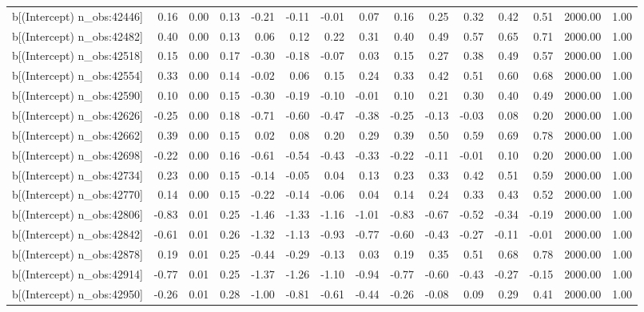 \begin{table}[ht]
\begin{tabular}{rrrrrrrrrrrrrrr}
  b[(Intercept) n\_obs:42446] & 0.16 & 0.00 & 0.13 & -0.21 & -0.11 & -0.01 & 0.07 & 0.16 & 0.25 & 0.32 & 0.42 & 0.51 & 2000.00 & 1.00 \\ 
  b[(Intercept) n\_obs:42482] & 0.40 & 0.00 & 0.13 & 0.06 & 0.12 & 0.22 & 0.31 & 0.40 & 0.49 & 0.57 & 0.65 & 0.71 & 2000.00 & 1.00 \\ 
  b[(Intercept) n\_obs:42518] & 0.15 & 0.00 & 0.17 & -0.30 & -0.18 & -0.07 & 0.03 & 0.15 & 0.27 & 0.38 & 0.49 & 0.57 & 2000.00 & 1.00 \\ 
  b[(Intercept) n\_obs:42554] & 0.33 & 0.00 & 0.14 & -0.02 & 0.06 & 0.15 & 0.24 & 0.33 & 0.42 & 0.51 & 0.60 & 0.68 & 2000.00 & 1.00 \\ 
  b[(Intercept) n\_obs:42590] & 0.10 & 0.00 & 0.15 & -0.30 & -0.19 & -0.10 & -0.01 & 0.10 & 0.21 & 0.30 & 0.40 & 0.49 & 2000.00 & 1.00 \\ 
  b[(Intercept) n\_obs:42626] & -0.25 & 0.00 & 0.18 & -0.71 & -0.60 & -0.47 & -0.38 & -0.25 & -0.13 & -0.03 & 0.08 & 0.20 & 2000.00 & 1.00 \\ 
  b[(Intercept) n\_obs:42662] & 0.39 & 0.00 & 0.15 & 0.02 & 0.08 & 0.20 & 0.29 & 0.39 & 0.50 & 0.59 & 0.69 & 0.78 & 2000.00 & 1.00 \\ 
  b[(Intercept) n\_obs:42698] & -0.22 & 0.00 & 0.16 & -0.61 & -0.54 & -0.43 & -0.33 & -0.22 & -0.11 & -0.01 & 0.10 & 0.20 & 2000.00 & 1.00 \\ 
  b[(Intercept) n\_obs:42734] & 0.23 & 0.00 & 0.15 & -0.14 & -0.05 & 0.04 & 0.13 & 0.23 & 0.33 & 0.42 & 0.51 & 0.59 & 2000.00 & 1.00 \\ 
  b[(Intercept) n\_obs:42770] & 0.14 & 0.00 & 0.15 & -0.22 & -0.14 & -0.06 & 0.04 & 0.14 & 0.24 & 0.33 & 0.43 & 0.52 & 2000.00 & 1.00 \\ 
  b[(Intercept) n\_obs:42806] & -0.83 & 0.01 & 0.25 & -1.46 & -1.33 & -1.16 & -1.01 & -0.83 & -0.67 & -0.52 & -0.34 & -0.19 & 2000.00 & 1.00 \\ 
  b[(Intercept) n\_obs:42842] & -0.61 & 0.01 & 0.26 & -1.32 & -1.13 & -0.93 & -0.77 & -0.60 & -0.43 & -0.27 & -0.11 & -0.01 & 2000.00 & 1.00 \\ 
  b[(Intercept) n\_obs:42878] & 0.19 & 0.01 & 0.25 & -0.44 & -0.29 & -0.13 & 0.03 & 0.19 & 0.35 & 0.51 & 0.68 & 0.78 & 2000.00 & 1.00 \\ 
  b[(Intercept) n\_obs:42914] & -0.77 & 0.01 & 0.25 & -1.37 & -1.26 & -1.10 & -0.94 & -0.77 & -0.60 & -0.43 & -0.27 & -0.15 & 2000.00 & 1.00 \\ 
  b[(Intercept) n\_obs:42950] & -0.26 & 0.01 & 0.28 & -1.00 & -0.81 & -0.61 & -0.44 & -0.26 & -0.08 & 0.09 & 0.29 & 0.41 & 2000.00 & 1.00 \\ 

\end{tabular}
\end{table}
